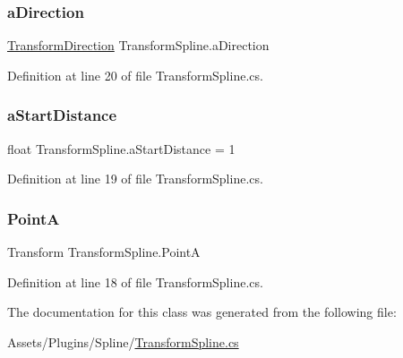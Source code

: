 \subsubsection{\texorpdfstring{a\+Direction}{aDirection}}
{\footnotesize\ttfamily \mbox{\hyperlink{_transform_spline_8cs_aa83ec4569fa5f851dd6585ebb349123b}{Transform\+Direction}} Transform\+Spline.\+a\+Direction}



Definition at line 20 of file Transform\+Spline.\+cs.

\mbox{\label{class_transform_spline_a197f93228b36c491a04b5b701fb59660}} 
\subsubsection{\texorpdfstring{a\+Start\+Distance}{aStartDistance}}
{\footnotesize\ttfamily float Transform\+Spline.\+a\+Start\+Distance = 1}



Definition at line 19 of file Transform\+Spline.\+cs.

\mbox{\label{class_transform_spline_aea9fd0137cf816b7c150237d6e6bbdeb}} 
\subsubsection{\texorpdfstring{PointA}{PointA}}
{\footnotesize\ttfamily Transform Transform\+Spline.\+PointA}



Definition at line 18 of file Transform\+Spline.\+cs.



The documentation for this class was generated from the following file\+:\begin{DoxyCompactItemize}
\item 
Assets/\+Plugins/\+Spline/\mbox{\hyperlink{_transform_spline_8cs}{Transform\+Spline.\+cs}}\end{DoxyCompactItemize}
